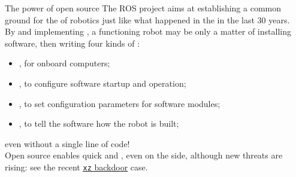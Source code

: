 \begin{frame}{The power of open source}
  The ROS project aims at establishing a common ground for the  of robotics just like what happened in the  in the last 30 years.\\
  \bigskip
  By  and implementing ,  a functioning robot may be only a matter of installing software, then writing four kinds of :
  \begin{itemize}
    \item {}, for onboard computers;
    \item {}, to configure software startup and operation;
    \item {}, to set configuration parameters for software modules;
    \item {}, to tell the software how the robot is built;
  \end{itemize}
  even without a single line of code!\\
  \bigskip
  Open source enables quick  and , even on the  side, although new threats are rising: see the recent \href{https://en.wikipedia.org/wiki/XZ_Utils_backdoor}{\color{blue}\underline{\texttt{xz} backdoor}} case.
\end{frame}

